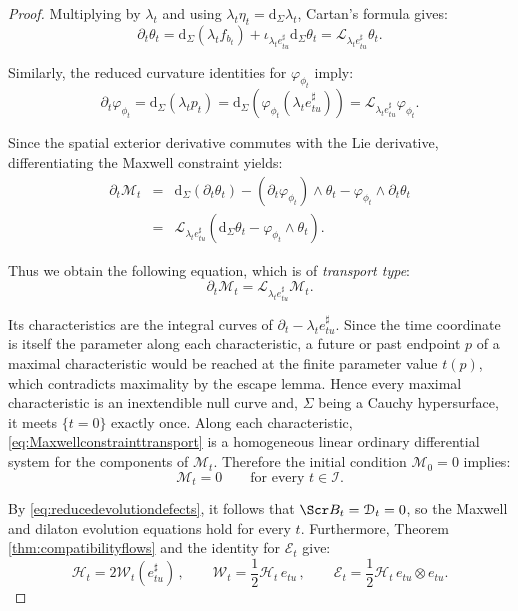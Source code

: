\documentclass[10pt,reqno,a4paper]{amsart}
\theoremstyle{plain}
\theoremstyle{definition}
\theoremstyle{remark}
\theoremstyle{remark}
\def\dd{\mathrm{d}}
\def\cB{\Scr B}
\def\cH{\mathcal{H}}
\def\cD{\mathcal{D}}
\def\cE{\mathcal{E}}
\def\cI{\mathcal{I}}
\def\cL{\mathcal{L}}
\def\cM{\mathcal{M}}
\def\cW{\mathcal{W}}
\def\cL{\mathcal{L}}
\def\cH{\mathcal{H}}
\renewcommand{\(}{ (}
\renewcommand{\)}{ )}
\begin{document}
\begin{proof}
\noindent Multiplying by $\lambda_t$ and using
$\lambda_t\eta_t=\dd_{\Sigma}\lambda_t$, Cartan's formula gives:
\begin{equation*}
\partial_t\theta_t
=\dd_{\Sigma}(\lambda_t f_{b_t})
+\iota_{\lambda_t e^{\sharp}_{tu}}\dd_{\Sigma}\theta_t
=\cL_{\lambda_t e^{\sharp}_{tu}}\theta_t.
\end{equation*}

\noindent
Similarly, the reduced curvature identities for $\varphi_{\phi_t}$ imply:
\begin{equation*}
\partial_t\varphi_{\phi_t}
=\dd_{\Sigma}(\lambda_t p_t)
=\dd_{\Sigma} (
\varphi_{\phi_t}(\lambda_t e^{\sharp}_{tu})
 )
=\cL_{\lambda_t e^{\sharp}_{tu}}\varphi_{\phi_t}.
\end{equation*}

\noindent
Since the spatial exterior derivative commutes with the Lie derivative, differentiating the Maxwell constraint yields:
\begin{eqnarray*}
\partial_t\cM_t
&=& \dd_{\Sigma}(\partial_t\theta_t)
-(\partial_t\varphi_{\phi_t})\wedge\theta_t
-\varphi_{\phi_t}\wedge\partial_t\theta_t\\
&=& \cL_{\lambda_t e^{\sharp}_{tu}}
 (\dd_{\Sigma}\theta_t-\varphi_{\phi_t}\wedge\theta_t ).
\end{eqnarray*}

\noindent
Thus we obtain the following equation, which is of \emph{transport type}:
\begin{equation}
\label{eq:Maxwellconstrainttransport}
\partial_t\cM_t
=\cL_{\lambda_t e^{\sharp}_{tu}}\cM_t.
\end{equation}

\noindent
Its characteristics are the integral curves of $\partial_t-\lambda_t e^{\sharp}_{tu}$. Since the time coordinate is itself the parameter along each characteristic, a future or past endpoint $p$ of a maximal characteristic would be reached at the finite parameter value $t(p)$, which contradicts maximality by the escape lemma. Hence every maximal characteristic is an inextendible null curve and, $\Sigma$ being a Cauchy hypersurface, it meets $\{t = 0\}$ exactly once. Along each characteristic, \eqref{eq:Maxwellconstrainttransport} is a homogeneous linear ordinary differential system for the components of $\cM_t$. Therefore the initial condition $\cM_0=0$ implies:
\begin{equation*}
\cM_t=0
\qquad\text{for every }t\in\cI.
\end{equation*}

\noindent
By \eqref{eq:reducedevolutiondefects}, it follows that $\cB_t=\cD_t=0$, so the Maxwell and dilaton evolution equations hold for every $t$. Furthermore, Theorem \ref{thm:compatibilityflows} and the identity for $\cE_t$ give:
\begin{equation*}
\cH_t=2\cW_t(e^{\sharp}_{tu})\, , \qquad
\cW_t=\frac{1}{2}\cH_t\,e_{tu}\, , \qquad
\cE_t=\frac{1}{2}\cH_t\,e_{tu}\otimes e_{tu}.
\end{equation*}


\end{proof}
\end{document}
